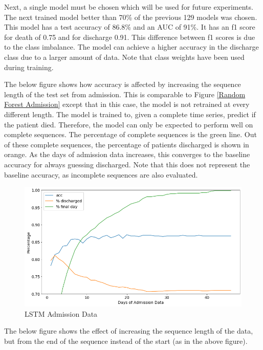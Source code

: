 \documentclass[12pt]{article}
\begin{document}
Next, a single model must be chosen which will be used for future experiments. The next trained model better than 70\% of the previous 129 models was chosen. This model has a test accuracy of 86.8\% and an AUC of 91\%. It has an f1 score for death of 0.75 and for discharge 0.91. This difference between f1 scores is due to the class imbalance. The model can achieve a higher accuracy in the discharge class due to a larger amount of data. Note that class weights have been used during training. 

The below figure shows how accuracy is affected by increasing the sequence length of the test set from admission. This is comparable to Figure \ref{Random Forest Admission} except that in this case, the model is not retrained at every different length. 
The model is trained to, given a complete time series, predict if the patient died. Therefore, the model can only be expected to perform well on complete sequences. The percentage of complete sequences is the green line. Out of these complete sequences, the percentage of patients discharged is shown in orange. As the days of admission data increases, this converges to the baseline accuracy for always guessing discharged. Note that this does not represent the baseline accuracy, as incomplete sequences are also evaluated. 
\begin{figure}[H]
\centering\caption{LSTM Admission Data}
\includegraphics[scale=0.52]{LSTM Admission Data.png}
\end{figure}

The below figure shows the effect of increasing the sequence length of the data, but from the end of the sequence instead of the start (as in the above figure).
\end{document}
